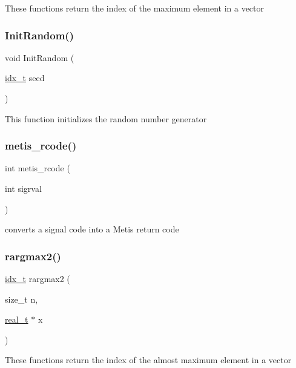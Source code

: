 These functions return the index of the maximum element in a vector \mbox{\label{a00870_a3fe8fb5828ccb460c4bb8089204545c7}} 
\subsubsection{\texorpdfstring{Init\+Random()}{InitRandom()}}
{\footnotesize\ttfamily void Init\+Random (\begin{DoxyParamCaption}\item[{\hyperlink{a00876_aaa5262be3e700770163401acb0150f52}{idx\+\_\+t}}]{seed }\end{DoxyParamCaption})}

This function initializes the random number generator \mbox{\label{a00870_ac721aa5656ee0877443c01d6fa19f72c}} 
\subsubsection{\texorpdfstring{metis\+\_\+rcode()}{metis\_rcode()}}
{\footnotesize\ttfamily int metis\+\_\+rcode (\begin{DoxyParamCaption}\item[{int}]{sigrval }\end{DoxyParamCaption})}

converts a signal code into a Metis return code \mbox{\label{a00870_a2ec32a1e9b7929439179408b14295e6e}} 
\subsubsection{\texorpdfstring{rargmax2()}{rargmax2()}}
{\footnotesize\ttfamily \hyperlink{a00876_aaa5262be3e700770163401acb0150f52}{idx\+\_\+t} rargmax2 (\begin{DoxyParamCaption}\item[{size\+\_\+t}]{n,  }\item[{\hyperlink{a00876_a1924a4f6907cc3833213aba1f07fcbe9}{real\+\_\+t} $\ast$}]{x }\end{DoxyParamCaption})}

These functions return the index of the almost maximum element in a vector 